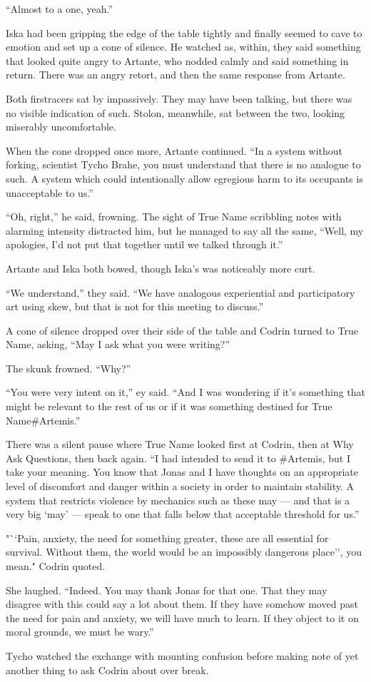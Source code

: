 ``Almost to a one, yeah.''

Iska had been gripping the edge of the table tightly and finally seemed to cave to emotion and set up a cone of silence. He watched as, within, they said something that looked quite angry to Artante, who nodded calmly and said something in return. There was an angry retort, and then the same response from Artante.

Both firstracers sat by impassively. They may have been talking, but there was no visible indication of such. Stolon, meanwhile, sat between the two, looking miserably uncomfortable.

When the cone dropped once more, Artante continued. ``In a system without forking, scientist Tycho Brahe, you must understand that there is no analogue to such. A system which could intentionally allow egregious harm to its occupants is unacceptable to us.''

``Oh, right,'' he said, frowning. The sight of True Name scribbling notes with alarming intensity distracted him, but he managed to say all the same, ``Well, my apologies, I'd not put that together until we talked through it.''

Artante and Iska both bowed, though Iska's was noticeably more curt.

``We understand,'' they said. ``We have analogous experiential and participatory art using skew, but that is not for this meeting to discuss.''

A cone of silence dropped over their side of the table and Codrin turned to True Name, asking, ``May I ask what you were writing?''

The skunk frowned. ``Why?''

``You were very intent on it,'' ey said. ``And I was wondering if it's something that might be relevant to the rest of us or if it was something destined for True Name\#Artemis.''

There was a silent pause where True Name looked first at Codrin, then at Why Ask Questions, then back again. ``I had intended to send it to \#Artemis, but I take your meaning. You know that Jonas and I have thoughts on an appropriate level of discomfort and danger within a society in order to maintain stability. A system that restricts violence by mechanics such as these may — and that is a very big `may' — speak to one that falls below that acceptable threshold for us.''

"``Pain, anxiety, the need for something greater, these are all essential for survival. Without them, the world would be an impossibly dangerous place'', you mean." Codrin quoted.

She laughed. ``Indeed. You may thank Jonas for that one. That they may disagree with this could say a lot about them. If they have somehow moved past the need for pain and anxiety, we will have much to learn. If they object to it on moral grounds, we must be wary.''

Tycho watched the exchange with mounting confusion before making note of yet another thing to ask Codrin about over break.
